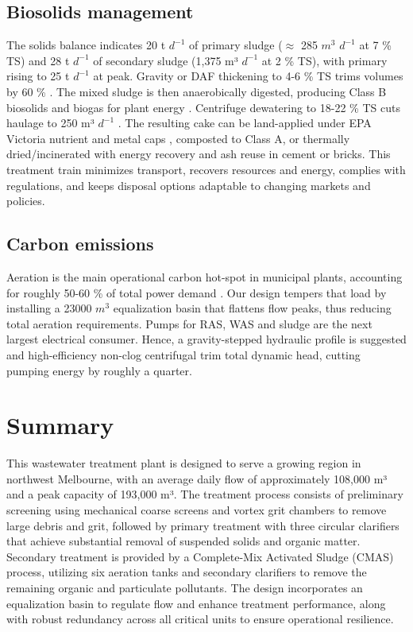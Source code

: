 \documentclass[11pt]{article}
\begin{document}
\subsection{Biosolids management}

The solids balance indicates 20 t $d^{-1}$ of primary sludge 
($\approx$ 285 $m^3$ $d^{-1}$ at 7 \% TS) and 28 t $d^{-1}$ of secondary sludge 
(1,375 m³ $d^{-1}$ at 2 \% TS), with primary rising to 25 t $d^{-1}$ 
at peak. Gravity or DAF thickening to 4-6 \% TS trims volumes 
by 60 \% \cite{metcalf_2014_wastewater}. The mixed sludge is then 
anaerobically digested, producing Class B biosolids and 
biogas for plant energy \cite{wef_DesignWaterResource}. Centrifuge 
dewatering to 18-22 \% TS cuts haulage to 250 m³ $d^{-1}$ 
\cite{EPA1993_CFR503}. The resulting cake can be land-applied 
under EPA Victoria nutrient and metal caps \cite{EPA1993_CFR503}, 
composted to Class A, or thermally dried/incinerated with 
energy recovery and ash reuse in cement or bricks. This treatment 
train minimizes transport, recovers resources and energy, 
complies with regulations, and keeps disposal options adaptable 
to changing markets and policies.

\subsection{Carbon emissions}

Aeration is the main operational carbon hot-spot in municipal 
plants, accounting for roughly 50-60 \% of total power 
demand \cite{metcalf_2014_wastewater}. Our design tempers 
that load by installing a 23000 $m^3$ equalization 
basin that flattens flow peaks, thus reducing 
total aeration requirements. Pumps for RAS, WAS 
and sludge are the next largest electrical 
consumer. Hence, a gravity-stepped hydraulic 
profile is suggested and high-efficiency non-clog 
centrifugal trim total dynamic head, cutting 
pumping energy by roughly a quarter.

\section{Summary}

This wastewater treatment plant is designed to serve 
a growing region in northwest Melbourne, with an average 
daily flow of approximately 108,000 m³ and a peak capacity 
of 193,000 m³. The treatment process consists of 
preliminary screening using mechanical coarse screens 
and vortex grit chambers to remove large debris and grit, 
followed by primary treatment with three circular 
clarifiers that achieve substantial removal of suspended 
solids and organic matter. Secondary treatment is 
provided by a Complete-Mix Activated Sludge (CMAS) process, 
utilizing six aeration tanks and secondary clarifiers to 
remove the remaining organic and particulate pollutants. 
The design incorporates an equalization basin to regulate 
flow and enhance treatment performance, along with robust 
redundancy across all critical units to ensure operational resilience.
\end{document}
